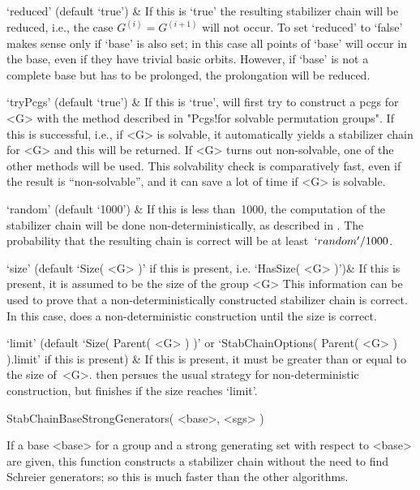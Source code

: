 `reduced' (default `true') &
        If this  is `true' the  resulting
        stabilizer chain   will  be reduced, i.e.,   the case  $G^{(i)} =
        G^{(i+1)}$  will  not occur. To set   `reduced'  to `false' makes
        sense only  if  `base' is also  set;  in this case  all points of
        `base' will occur  in the base,  even if they have  trivial basic
        orbits. However, if `base' is  not a complete base  but has to be
        prolonged, the prolongation will be reduced.

`tryPcgs' (default `true') &
        If this is `true', {\GAP} will first try to  construct a pcgs for
        <G> with  the method described  in "Pcgs!for solvable permutation
        groups".  If this is  successful, i.e.,  if  <G> is  solvable, it
        automatically yields a stabilizer chain for <G>  and this will be
        returned. If <G> turns out non-solvable, one of the other methods
        will be used. This solvability  check is comparatively fast, even
        if the result is ``non-solvable'', and it  can save a lot of time
        if <G> is solvable.

`random' (default `1000') &
        If this  is  less than~1000,  the  computation of the  stabilizer
        chain  will  be   done  non-deterministically, as  described   in
        \cite{Seress97}. The  probability  that the  resulting  chain  is
        correct will be at least~$`random'/1000$.

`size' (default `Size( <G> )' if this is present, i.e. `HasSize( <G> )')&
        If this is present, it is assumed to be the size of the group <G>
        This      information    can  be    used    to   prove    that  a
        non-deterministically constructed stabilizer chain is correct. In
        this case, {\GAP} does a non-deterministic construction until the
        size is correct.

`limit' (default `Size( Parent( <G> ) )' or `StabChainOptions( Parent(
<G> ) ).limit' if this is present) &
        If this is present, it must be greater than or  equal to the size
        of~<G>.   {\GAP}   then    persues   the   usual   strategy   for
        non-deterministic construction,  but finishes if the size reaches
        `limit'.
\enditems

\>StabChainBaseStrongGenerators( <base>, <sgs> )

If a base <base> for a group and a strong generating  set with respect to
<base> are given, this function constructs a stabilizer chain without the
need to find Schreier  generators; so this  is much faster than the other
algorithms.

